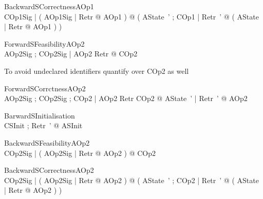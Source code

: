 \begin{theorem}{ BackwardSCorrectnessAOp1}\\
 \forall COp1Sig | ( \forall AOp1Sig | Retr @ \pre AOp1 ) @ ( \forall AState~' ; COp1 | Retr~' @ ( \exists AState | Retr @ AOp1 ) ) \\

\end{theorem}




\begin{theorem}{ ForwardSFeasibilityAOp2}\\
 \forall AOp2Sig ; COp2Sig | \pre AOp2 \land Retr @ \pre COp2 \\

\end{theorem}



To avoid undeclared identifiers quantify over COp2 as well
\begin{theorem}{ ForwardSCorrctnessAOp2}\\
 \forall AOp2Sig ; COp2Sig ; COp2 | \pre AOp2 \land Retr \land COp2 @ \exists AState~' | Retr~' @ AOp2 \\

\end{theorem}



\begin{theorem}{ BarwardSInitialisation}\\
 \forall CSInit ; Retr~' @ ASInit \\

\end{theorem}



\begin{theorem}{ BackwardSFeasibilityAOp2}\\
 \forall COp2Sig | ( \forall AOp2Sig | Retr @ \pre AOp2 ) @ \pre COp2 \\

\end{theorem}



\begin{theorem}{ BackwardSCorrectnessAOp2}\\
 \forall COp2Sig | ( \forall AOp2Sig | Retr @ \pre AOp2 ) @ ( \forall AState~' ; COp2 | Retr~' @ ( \exists AState | Retr @ AOp2 ) ) \\

\end{theorem}

